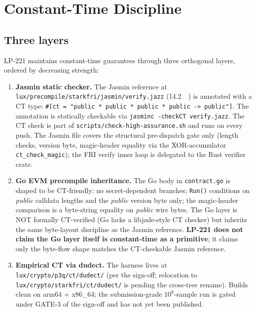 \section{Constant-Time Discipline}
\label{sec:constant-time}

\subsection{Three layers}

LP-221 maintains constant-time guarantees through three orthogonal
layers, ordered by decreasing strength:

\begin{enumerate}[leftmargin=2em,nosep]
\item \textbf{Jasmin static checker.} The Jasmin reference at
  \texttt{lux/precompile/starkfri/jasmin/verify.jazz}
  (\SI{14.2}{\kilo\byte}) is annotated with a CT type:
  \texttt{\#[ct = "public * public * public * public -> public"]}.
  The annotation is statically checkable via
  \texttt{jasminc -checkCT verify.jazz}. The CT check is part of
  \texttt{scripts/check-high-assurance.sh} and runs on every push.
  The Jasmin file covers the structural pre-dispatch gate only
  (length checks, version byte, magic-header equality via the
  XOR-accumulator \texttt{ct\_check\_magic}); the FRI verify inner
  loop is delegated to the Rust verifier crate.
\item \textbf{Go EVM precompile inheritance.} The Go body in
  \texttt{contract.go} is shaped to be CT-friendly: no
  secret-dependent branches; \texttt{Run()} conditions on
  \emph{public} calldata lengths and the \emph{public} version
  byte only; the magic-header comparison is a byte-string
  equality on \emph{public} wire bytes. The Go layer is NOT
  formally CT-verified (Go lacks a libjade-style CT checker) but
  inherits the same byte-layout discipline as the Jasmin reference.
  \textbf{LP-221 does not claim the Go layer itself is
  constant-time as a primitive}; it claims only the byte-flow
  shape matches the CT-checkable Jasmin reference.
\item \textbf{Empirical CT via dudect.} The harness lives at
  \texttt{lux/crypto/p3q/ct/dudect/} (per the sign-off; relocation
  to \texttt{lux/crypto/starkfri/ct/dudect/} is pending the
  cross-tree rename). Builds clean on arm64 + x86\_64; the
  submission-grade $10^9$-sample run is gated under GATE-3 of the
  sign-off and has not yet been published.
\end{enumerate}


